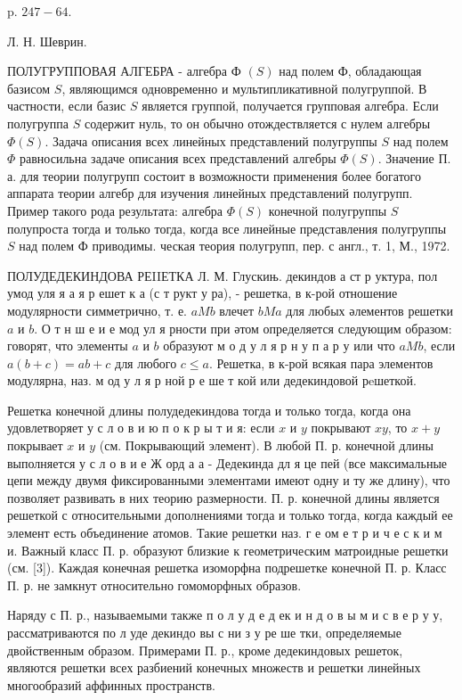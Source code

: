 \documentclass[10pt]{article}
\begin{document}
p. $247-64$.

Л. Н. Шеврин.



ПОЛУГРУППОВАЯ АЛГЕБРА - алгебра Ф $(S)$ над полем Ф, обладающая базисом $S$, являющимся одновременно и мультипликативной полугруппой. В частности, если базис $S$ является группой, получается групповая алгебра. Если полугруппа $S$ содержит нуль, то он обычно отождествляется с нулем алгебры $\Phi(S)$. Задача описания всех линейных представлений полугруппы $S$ над полем $\Phi$ равносильна задаче описания всех представлений алгебры $\Phi(S)$. Значение П. а. для теории полугрупп состоит в возможности применения более богатого аппарата теории алгебр для изучения линейных представлений полугрупп. Пример такого рода результата: алгебра $\Phi(S)$ конечной полугруппы $S$ полупроста тогда и только тогда, когда все линейные представления полугруппы $S$ над полем Ф приводимы. ческая теория полугрупп, пер. с англ., т. 1, М., 1972.



ПОЛУДЕДЕКИНДОВА РЕIIЕТКА Л. М. Глускињ. декиндов а ст р уктура, пол умод уля я а я р ешет к а (с т рукт у ра), - решетка, в к-рой отношение модулярности симметрично, т. е. $a M b$ влечет $b M a$ для любых әлементов решетки $a$ и $b$. О т н ш е и е мод ул я рности при әтом определяется следующим образом: говорят, что элементы $a$ и $b$ образуют м о д у л я р н у п а р у или что $a M b$, если $a(b+c)=a b+c$ для любого $c \leqslant a$. Решетка, в к-рой всякая пара элементов модулярна, наз. м од у л я р ной р е ше т кой или дедекиндовой рeшеткой.



Решетка конечной длины полудедекиндова тогда и только тогда, когда она удовлетворяет у с л о в и ю п о к р ы т и я: если $x$ и $y$ покрывают $x y$, то $x+y$ покрывает $x$ и $y$ (см. Покрывающий элемент). В любой П. р. конечной длины выполняется у с л о в и е Ж орд а а - Дедекинда дл я це пей (все максимальные цепи между двумя фиксированными элементами имеют одну и ту же длину), что позволяет развивать в них теорию размерности. П. р. конечной длины является решеткой с относительными дополнениями тогда и только тогда, когда каждый ее элемент есть объединение атомов. Такие решетки наз. г е ом е т р и ч е с к и м и. Важный класс П. р. образуют близкие к геометрическим матроидные решетки (см. [3]). Каждая конечная решетка изоморфна подрешетке конечной П. р. Класс П. р. не замкнут относительно гомоморфных образов.



Наряду с П. р., называемыми также п о л у д е д ек и н д о в ы м и с в е р у у, рассматриваются по л уде декиндо вы с ни з у ре ше тки, определяемые двойственным образом. Примерами П. р., кроме дедекиндовых решеток, являются решетки всех разбиений конечных множеств и решетки линейных многообразий аффинных пространств.
\end{document}
